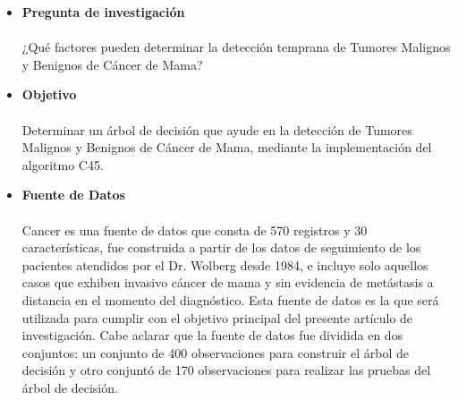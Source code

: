 \documentclass[letterpaper, 10 pt, conference]{ieeeconf}
\begin{document}
\begin{itemize}[leftmargin=*]
    \item \textbf{Pregunta de investigación}
    \\ \\¿Qué factores pueden determinar la detección temprana de Tumores Malignos y Benignos de Cáncer de Mama?\\
    
    \item \textbf{Objetivo}
    \\ \\ Determinar un árbol de decisión que ayude en la detección de Tumores Malignos y Benignos de Cáncer de Mama, mediante la implementación del algoritmo C45.\\

    \item \textbf{Fuente de Datos}
    \\ \\ Cancer \cite{dataset:2019} es una fuente de datos que consta de 570 registros y 30 características, fue construida a partir de los datos de seguimiento de los pacientes atendidos por el Dr. Wolberg desde 1984, e incluye solo aquellos casos que exhiben invasivo cáncer de mama y sin evidencia de metástasis a distancia en el momento del diagnóstico. Esta fuente de datos es la que será utilizada para cumplir con el objetivo principal del presente artículo de investigación. Cabe aclarar que la fuente de datos fue dividida en dos conjuntos: un conjunto de 400 observaciones para construir el árbol de decisión y otro conjuntó de 170 observaciones para realizar las pruebas del árbol de decisión.
\end{itemize}
\end{document}
